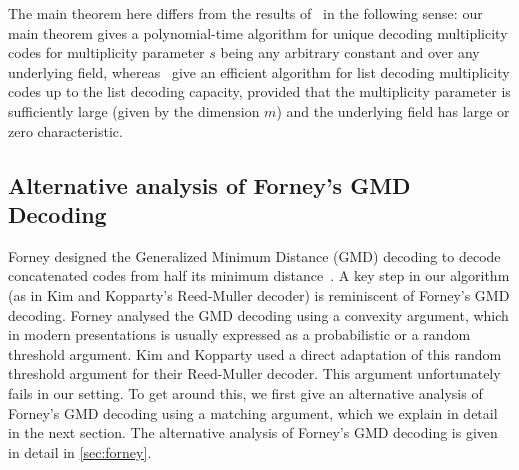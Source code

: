 \documentclass{article}
\begin{document}
	The main theorem here differs from the results of~\cite{BhandariHKS2021-mgrid} in the following sense: our main theorem gives a polynomial-time algorithm for unique decoding multiplicity codes for multiplicity parameter $s$ being any arbitrary constant and over any underlying field, whereas~\cite{BhandariHKS2021-mgrid} give an efficient algorithm for list decoding multiplicity codes up to the list decoding capacity, provided that the multiplicity parameter is sufficiently large (given by the dimension $m$) and the underlying field has large or zero characteristic. 
	
	\subsection{Alternative analysis of Forney's GMD Decoding}
	
	Forney designed the Generalized Minimum Distance (GMD) decoding to
	decode concatenated codes from half its minimum distance~\cite{Forney1965, Forney1966}. A key step in
	our algorithm (as in Kim and Kopparty's Reed-Muller decoder) is
	reminiscent of Forney's GMD decoding. Forney analysed the GMD decoding
	using a convexity argument, which in modern presentations is usually
	expressed as a probabilistic or a random threshold argument.  Kim and Kopparty used a direct adaptation
	of this random threshold argument for their Reed-Muller decoder. This
	argument unfortunately fails in our setting. To get
	around this, we first give an alternative analysis of Forney's GMD
	decoding using a matching argument, which we explain in detail in the next section. The alternative
	analysis of Forney's GMD decoding is given in detail in \cref{sec:forney}. 
	
	
\end{document}
